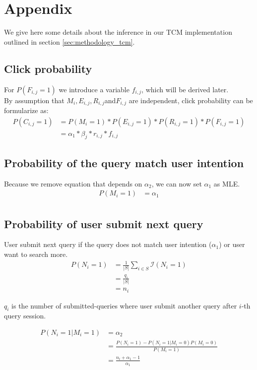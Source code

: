 \appendix
\section{Appendix}
\label{app:tcm_eq}
We give here some details about the inference in our TCM implementation outlined in section \ref{sec:methodology_tcm}.

\subsection{Click probability}
For $P(F_{i,j}=1)$ we introduce a variable $f_{i,j}$, which will be derived later. \\
By assumption that $M_i, E_{i,j},R_{i,j}$and$F_{i,j}$ are independent, click probability can be formularize as:
\begin{align}
P(C_{i,j} = 1)
&= P(M_i=1) * P(E_{i,j}=1) * P(R_{i,j}=1) * P(F_{i,j} = 1) \\
&= \alpha_1 * \beta_j * r_{i,j} * f_{i,j}
\label{eq:proba_click}
\end{align}

\subsection{Probability of the query match user intention}
Because we remove equation that depends on $\alpha_2$, we can now set $\alpha_1$ as MLE.
\begin{align*}
P(M_i = 1) 
&= \alpha_1 \\
\end{align*}

\subsection{Probability of user submit next query}
User submit next query if the query does not match user intention ($\alpha_1$) or user want to search more.
\begin{align*}
P(N_i=1) 
&= \frac{1}{|S|} \sum_{i\in S} \mathcal{I}(N_i=1) \\
&= \frac{q_i}{|S|} \\
&= n_i
\end{align*}

$q_i$ is the number of submitted-queries where user submit another query after $i$-th query session.

\begin{align*}
P(N_i=1|M_i=1) 
&= \alpha_2 \\
&= \frac{P(N_i=1) - P(N_i=1|M_i=0)P(M_i=0)}{P(M_i=1)} \\
&= \frac{n_i + \alpha_1 - 1}{\alpha_1}
\end{align*}

